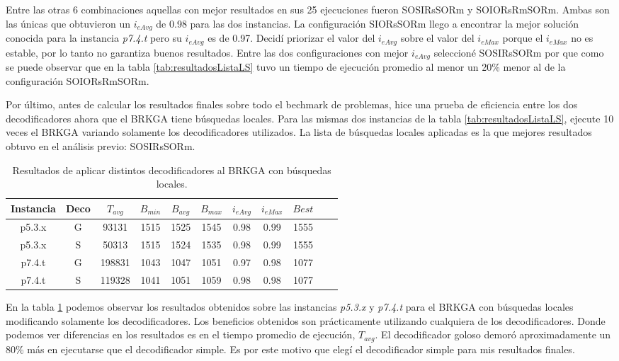 \bigskip

Entre las otras 6 combinaciones aquellas con mejor resultados en sus 25 ejecuciones fueron SOSIRsSORm y SOIORsRmSORm. Ambas son las únicas que obtuvieron un $i_{eAvg}$ de 0.98 para las dos instancias. La configuración SIORsSORm llego a encontrar la mejor solución conocida para la instancia \textit{p7.4.t} pero su $i_{eAvg}$ es de 0.97. Decidí priorizar el valor del $i_{eAvg}$ sobre el valor del $i_{eMax}$ porque el $i_{eMax}$ no es estable, por lo tanto no garantiza buenos resultados. Entre las dos configuraciones con mejor $i_{eAvg}$ seleccioné SOSIRsSORm por que como se puede observar que en la tabla \ref{tab:resultadosListaLS} tuvo un tiempo de ejecución promedio al menor un 20\% menor al de la configuración SOIORsRmSORm.

\bigskip

Por último, antes de calcular los resultados finales sobre todo el bechmark de problemas, hice una prueba de eficiencia entre los dos decodificadores ahora que el BRKGA tiene búsquedas locales. Para las mismas dos instancias de la tabla \ref{tab:resultadosListaLS}, ejecute 10 veces el BRKGA variando solamente los decodificadores utilizados. La lista de búsquedas locales aplicadas es la que mejores resultados obtuvo en el análisis previo: SOSIRsSORm.

\bigskip

\begin{table}
\begin{center}
\begin{tabular}{ |c|c|c|c|c|c|c|c|c|c|c| } 
\hline
Instancia & Deco & $T_{avg}$ & $B_{min}$ & $B_{avg}$ & $B_{max}$ & $i_{eAvg}$ & $i_{eMax}$ & $Best$ \\
\hline
p5.3.x & G & 93131 & 1515 & 1525 & 1545 & 0.98 & 0.99 & 1555  \\
p5.3.x & S & 50313 & 1515 & 1524 & 1535 & 0.98 & 0.99 & 1555  \\
p7.4.t & G & 198831 & 1043 & 1047 & 1051 & 0.97 & 0.98 & 1077  \\
p7.4.t & S & 119328 & 1041 & 1051 & 1059 & 0.98 & 0.98 & 1077  \\
\hline
\end{tabular}
\end{center}
\caption{Resultados de aplicar distintos decodificadores al BRKGA con búsquedas locales.}
\label{tab:resultadosLSDecos}
\end{table}

\bigskip

En la tabla \ref{tab:resultadosLSDecos} podemos observar los resultados obtenidos sobre las instancias \textit{p5.3.x} y \textit{p7.4.t} para el BRKGA con búsquedas locales modificando solamente los decodificadores. Los beneficios obtenidos son prácticamente utilizando cualquiera de los decodificadores. Donde podemos ver diferencias en los resultados es en el tiempo promedio de ejecución, $T_{avg}$. El decodificador goloso demoró aproximadamente un 80\% más en ejecutarse que el decodificador simple. Es por este motivo que elegí el decodificador simple para mis resultados finales.

